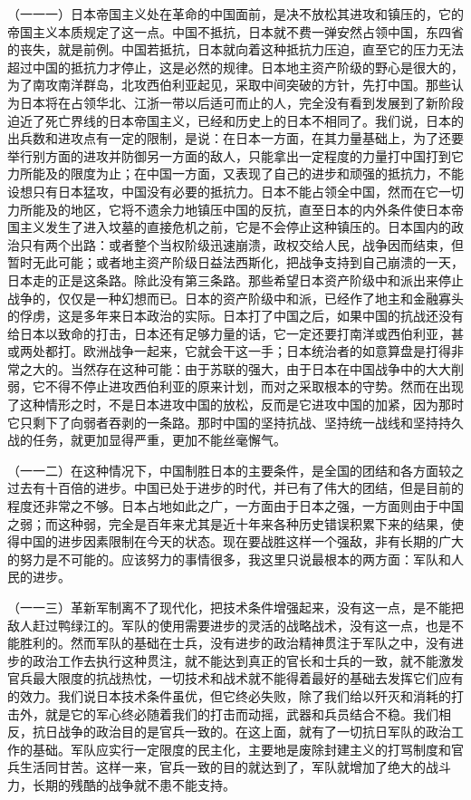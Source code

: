 \documentclass[UTF8, 12pt, a4paper]{ctexrep}
\begin{document}
（一一一）日本帝国主义处在革命的中国面前，是决不放松其进攻和镇压的，它的帝国主义本质规定了这一点。中国不抵抗，日本就不费一弹安然占领中国，东四省的丧失，就是前例。中国若抵抗，日本就向着这种抵抗力压迫，直至它的压力无法超过中国的抵抗力才停止，这是必然的规律。日本地主资产阶级的野心是很大的，为了南攻南洋群岛，北攻西伯利亚起见，采取中间突破的方针，先打中国。那些认为日本将在占领华北、江浙一带以后适可而止的人，完全没有看到发展到了新阶段迫近了死亡界线的日本帝国主义，已经和历史上的日本不相同了。我们说，日本的出兵数和进攻点有一定的限制，是说：在日本一方面，在其力量基础上，为了还要举行别方面的进攻并防御另一方面的敌人，只能拿出一定程度的力量打中国打到它力所能及的限度为止；在中国一方面，又表现了自己的进步和顽强的抵抗力，不能设想只有日本猛攻，中国没有必要的抵抗力。日本不能占领全中国，然而在它一切力所能及的地区，它将不遗余力地镇压中国的反抗，直至日本的内外条件使日本帝国主义发生了进入坟墓的直接危机之前，它是不会停止这种镇压的。日本国内的政治只有两个出路：或者整个当权阶级迅速崩溃，政权交给人民，战争因而结束，但暂时无此可能；或者地主资产阶级日益法西斯化，把战争支持到自己崩溃的一天，日本走的正是这条路。除此没有第三条路。那些希望日本资产阶级中和派出来停止战争的，仅仅是一种幻想而已。日本的资产阶级中和派，已经作了地主和金融寡头的俘虏，这是多年来日本政治的实际。日本打了中国之后，如果中国的抗战还没有给日本以致命的打击，日本还有足够力量的话，它一定还要打南洋或西伯利亚，甚或两处都打。欧洲战争一起来，它就会干这一手；日本统治者的如意算盘是打得非常之大的。当然存在这种可能：由于苏联的强大，由于日本在中国战争中的大大削弱，它不得不停止进攻西伯利亚的原来计划，而对之采取根本的守势。然而在出现了这种情形之时，不是日本进攻中国的放松，反而是它进攻中国的加紧，因为那时它只剩下了向弱者吞剥的一条路。那时中国的坚持抗战、坚持统一战线和坚持持久战的任务，就更加显得严重，更加不能丝毫懈气。

（一一二）在这种情况下，中国制胜日本的主要条件，是全国的团结和各方面较之过去有十百倍的进步。中国已处于进步的时代，并已有了伟大的团结，但是目前的程度还非常之不够。日本占地如此之广，一方面由于日本之强，一方面则由于中国之弱；而这种弱，完全是百年来尤其是近十年来各种历史错误积累下来的结果，使得中国的进步因素限制在今天的状态。现在要战胜这样一个强敌，非有长期的广大的努力是不可能的。应该努力的事情很多，我这里只说最根本的两方面：军队和人民的进步。

（一一三）革新军制离不了现代化，把技术条件增强起来，没有这一点，是不能把敌人赶过鸭绿江的。军队的使用需要进步的灵活的战略战术，没有这一点，也是不能胜利的。然而军队的基础在士兵，没有进步的政治精神贯注于军队之中，没有进步的政治工作去执行这种贯注，就不能达到真正的官长和士兵的一致，就不能激发官兵最大限度的抗战热忱，一切技术和战术就不能得着最好的基础去发挥它们应有的效力。我们说日本技术条件虽优，但它终必失败，除了我们给以歼灭和消耗的打击外，就是它的军心终必随着我们的打击而动摇，武器和兵员结合不稳。我们相反，抗日战争的政治目的是官兵一致的。在这上面，就有了一切抗日军队的政治工作的基础。军队应实行一定限度的民主化，主要地是废除封建主义的打骂制度和官兵生活同甘苦。这样一来，官兵一致的目的就达到了，军队就增加了绝大的战斗力，长期的残酷的战争就不患不能支持。
\end{document}

